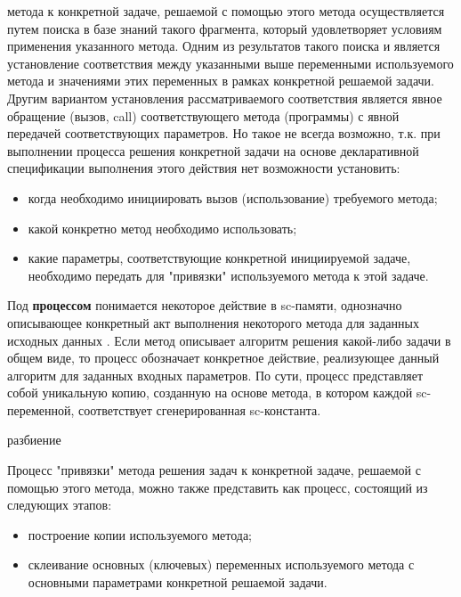  метода к конкретной задаче, решаемой с помощью этого метода осуществляется путем поиска в базе знаний такого фрагмента, который удовлетворяет условиям применения указанного метода. Одним из результатов такого поиска и является установление соответствия между указанными выше переменными используемого метода и значениями этих переменных в рамках конкретной решаемой задачи. Другим вариантом установления рассматриваемого соответствия является явное обращение (вызов, call) соответствующего метода (программы) с явной передачей соответствующих параметров. Но такое не всегда возможно, т.к. при выполнении процесса решения конкретной задачи на основе декларативной спецификации выполнения этого действия нет возможности установить:
\begin{itemize}
    \item когда необходимо инициировать вызов (использование) требуемого метода;
    \item какой конкретно метод необходимо использовать;
    \item какие параметры, соответствующие конкретной инициируемой задаче, необходимо передать для "привязки" используемого метода к этой задаче.
\end{itemize}

Под \textbf{процессом} понимается некоторое действие в sc-памяти, однозначно описывающее конкретный акт выполнения некоторого метода для заданных исходных данных \cite{Deikstra1978}. Если метод описывает алгоритм решения какой-либо задачи в общем виде, то процесс обозначает конкретное действие, реализующее данный алгоритм для заданных входных параметров. По сути, процесс представляет собой уникальную копию, созданную на основе метода, в котором каждой sc-переменной, соответствует сгенерированная sc-константа.

\begin{SCn}
\begin{scnrelfromset}{разбиение}
\end{scnrelfromset}
\end{SCn}

Процесс "привязки" метода решения задач к конкретной задаче, решаемой с помощью этого метода, можно также представить как процесс, состоящий из следующих этапов:
\begin{itemize}
    \item построение копии используемого метода;
    \item склеивание основных (ключевых) переменных используемого метода с основными параметрами конкретной решаемой задачи.
\end{itemize}

